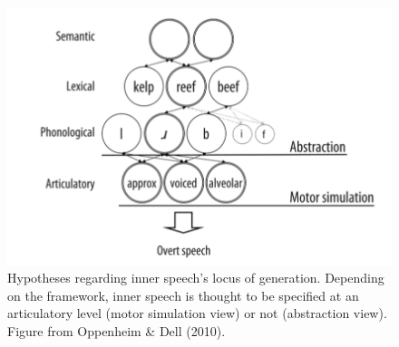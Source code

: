 \documentclass[a4paper,12pt,twoside,onecolumn,openright,final,oldfontcommands]{memoir}
\begin{document}
\begin{figure}[ht]

{\centering \includegraphics[width=0.66\linewidth]{assets/oppenheim} 

}

\caption{Hypotheses regarding inner speech's locus of generation. Depending on the framework, inner speech is thought to be specified at an articulatory level (motor simulation view) or not (abstraction view). Figure from Oppenheim \& Dell (2010).}\label{fig:oppenheim}
\end{figure}
\end{document}
